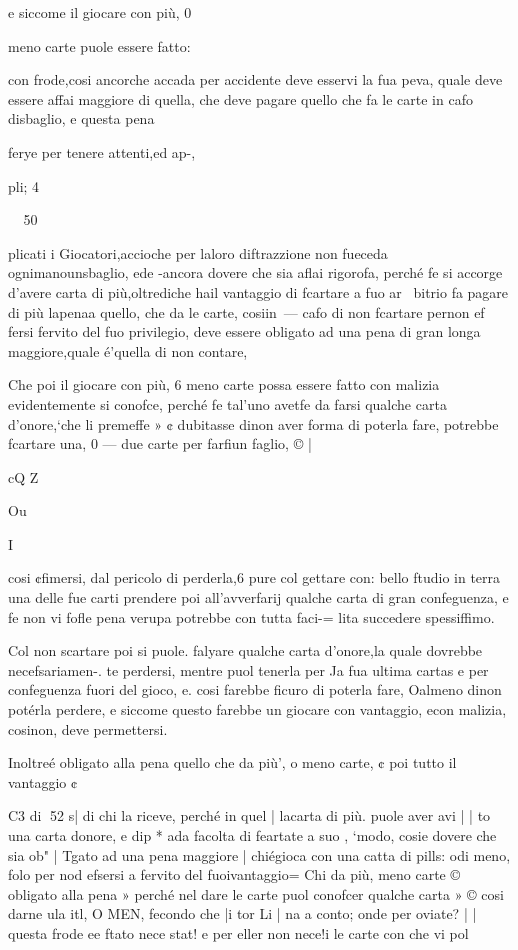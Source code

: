 \documentclass[12pt,a6paper]{article}
\begin{document}
e siccome il giocare con più, 0

meno carte puole essere fatto:

con frode,cosi ancorche accada
per accidente deve esservi la
fua peva, quale deve essere affai maggiore di quella, che deve pagare quello che fa le carte
in cafo disbaglio, e questa pena

ferye per tenere attenti,ed ap-,

pli; 4

~
50

plicati i Giocatori,accioche per
laloro diftrazzione non fueceda ognimanounsbaglio, ede
-ancora dovere che sia aflai rigorofa, perché fe si accorge d’avere carta di più,oltrediche hail
vantaggio di fcartare a fuo ar~
bitrio fa pagare di più lapenaa
quello, che da le carte, cosiin~—
cafo di non fcartare pernon ef
fersi fervito del fuo privilegio,
deve essere obligato ad una pena di gran longa maggiore,quale é’quella di non contare,

Che poi il giocare con più, 6
meno carte possa essere fatto
con malizia evidentemente si
conofce, perché fe tal’uno avetfe da farsi qualche carta d’onore,‘che li premeffe » ¢ dubitasse
dinon aver forma di poterla
fare, potrebbe fcartare una, 0 —
due carte per farfiun faglio, © |

cQ
Z
 

Ou

I

cosi ¢fimersi, dal pericolo di
perderla,6 pure col gettare con:
bello ftudio in terra una delle
fue carti prendere poi all’avverfarij qualche carta di gran confeguenza, e fe non vi fofle pena
verupa potrebbe con tutta faci-=
lita succedere spessiffimo. 

Col non scartare poi si puole.
falyare qualche carta d’onore,la
quale dovrebbe necefsariamen-.
te perdersi, mentre puol tenerla per Ja fua ultima cartas e per
confeguenza fuori del gioco, e.
cosi farebbe ficuro di poterla fare, Oalmeno dinon potérla
perdere, e siccome questo farebbe un giocare con vantaggio, econ malizia, cosinon,
deve permettersi.

Inoltreé obligato alla pena
quello che da più’, o meno carte, ¢ poi tutto il vantaggio ¢

C3 di
52
s| di chi la riceve, perché in quel
| lacarta di più. puole aver avi
| | to una carta donore, e dip *
ada facolta di feartate a suo
, ‘modo, cosie dovere che sia ob"
| Tgato ad una pena maggiore
| chiégioca con una catta di pills:
odi meno, folo per nod efsersi
a fervito del fuoivantaggio=
Chi da più, meno carte ©
obligato alla pena » perché nel
dare le carte puol conofcer
qualche carta » © cosi darne ula
itl, O MEN, fecondo che |i tor
Li | na a conto; onde per oviate?
| | questa frode ee ftato nece stat!
e per eller
non nece!i le carte con
che vi pol
\end{document}
